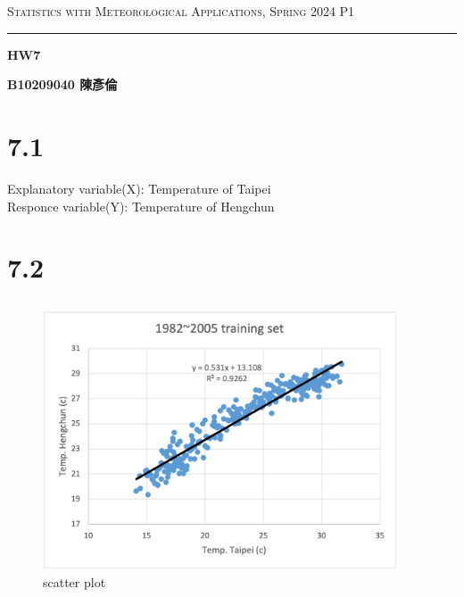 \documentclass{article}
\author{B10209040 陳彥倫}
\begin{document}
\thispagestyle{empty}
\hfill {\scshape \large Statistics with Meteorological Applications, Spring 2024} \hfill {\scshape P1}
\smallskip
\hrule
\begin{CJK*}{UTF8}{bsmi}
\bigskip
\bigskip
\bigskip

\centerline{\huge \textbf {HW7}}
\bigskip
\centerline{\textbf {B10209040 陳彥倫}}

\bigskip
\bigskip
\bigskip

\section*{7.1}
    \begin{spacing}{2.5}
        \begin{large}
            \begin{center}
                Explanatory variable(X): Temperature of Taipei\\
                Responce variable(Y): Temperature of Hengchun
            \end{center}
        \end{large}
    \end{spacing}

\section*{7.2}
    \subsection*{}
        \begin{figure}[htbp]
            \centering
            \begin{minipage}[t]{0.7\textwidth}
                \centering
                \includegraphics[width=10.5cm]{Picture1.png}
                \caption{scatter plot}
                \end{minipage}
        \end{figure}


\end{CJK*}
\end{document}
